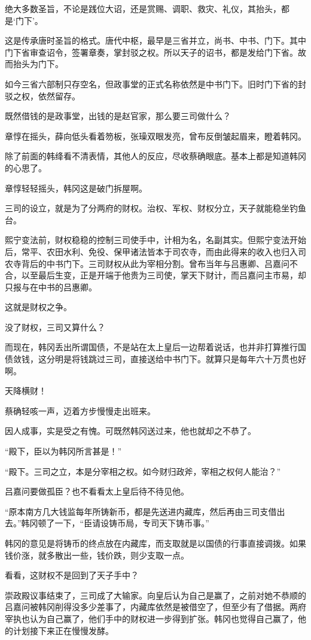 绝大多数圣旨，不论是践位大诏，还是赏赐、调职、救灾、礼仪，其抬头，都是‘门下’。

这是传承唐时圣旨的格式。唐代中枢，最早是三省并立，尚书、中书、门下。其中门下省审查诏令，签署章奏，掌封驳之权。所以天子的诏书，都是发给门下省。故而抬头为门下。

如今三省六部制只存空名，但政事堂的正式名称依然是中书门下。旧时门下省的封驳之权，依然留存。

既然借钱的是政事堂，出钱的是赵官家，那么要三司做什么？

章惇在摇头，薛向低头看着笏板，张璪双眼发亮，曾布反倒皱起眉来，瞪着韩冈。

除了前面的韩绛看不清表情，其他人的反应，尽收蔡确眼底。基本上都是知道韩冈的心思了。

章惇轻轻摇头，韩冈这是破门拆屋啊。

三司的设立，就是为了分两府的财权。治权、军权、财权分立，天子就能稳坐钓鱼台。

熙宁变法前，财权稳稳的控制三司使手中，计相为名，名副其实。但熙宁变法开始后，常平、农田水利、免役、保甲诸法皆本于司农寺，而由此得来的收入也归入司农寺背后的中书门下。三司财权从此为宰相分割。曾布当年与吕惠卿、吕嘉问不合，以至最后生变，正是开端于他贵为三司使，掌天下财计，而吕嘉问主市易，却只报与在中书的吕惠卿。

这就是财权之争。

没了财权，三司又算什么？

而现在，韩冈丢出所谓国债，不是站在太上皇后一边帮着说话，也并非打算推行国债敛钱，这分明是将钱跳过三司，直接送给中书门下。就算只是每年六十万贯也好啊。

天降横财！

蔡确轻咳一声，迈着方步慢慢走出班来。

因人成事，实是受之有愧。可既然韩冈送过来，他也就却之不恭了。

“殿下，臣以为韩冈所言甚是！”

“殿下。三司之立，本是分宰相之权。如今财归政斧，宰相之权何人能治？”

吕嘉问要做孤臣？也不看看太上皇后待不待见他。

“原本南方几大钱监每年所铸新币，都是先送进内藏库，然后再由三司支借出去。”韩冈顿了一下，“臣请设铸币局，专司天下铸币事。”

韩冈的意见是将铸币的终点放在内藏库，而支取就是以国债的行事直接调拨。如果钱价涨，就多散出一些，钱价跌，则少支取一点。

看看，这财权不是回到了天子手中？

崇政殿议事结束了，三司成了大输家。向皇后认为自己是赢了，之前对她不恭顺的吕嘉问被韩冈削得没多少差事了，内藏库依然是被借空了，但至少有了借据。两府宰执也认为自己赢了，他们手中的财权进一步得到扩张。韩冈也觉得自己赢了，他的计划接下来正在慢慢发酵。

